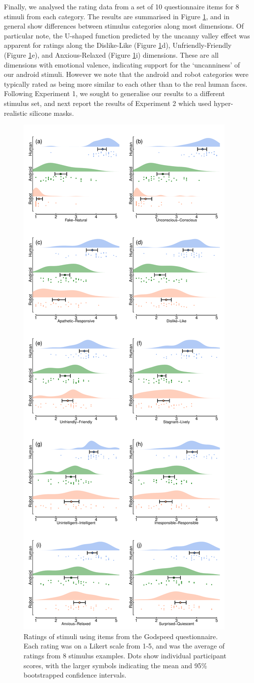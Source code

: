 \documentclass[
]{article}
\begin{document}
Finally, we analysed the rating data from a set of 10 questionnaire items for 8 stimuli from each category. The results are summarised in Figure \ref{fig:robotratings}, and in general show differences between stimulus categories along most dimensions. Of particular note, the U-shaped function predicted by the uncanny valley effect was apparent for ratings along the Dislike-Like (Figure \ref{fig:robotratings}d), Unfriendly-Friendly (Figure \ref{fig:robotratings}e), and Anxious-Relaxed (Figure \ref{fig:robotratings}i) dimensions. These are all dimensions with emotional valence, indicating support for the `uncanniness' of our android stimuli. However we note that the android and robot categories were typically rated as being more similar to each other than to the real human faces. Following Experiment 1, we sought to generalise our results to a different stimulus set, and next report the results of Experiment 2 which used hyper-realistic silicone masks.

\begin{figure}

{\centering \includegraphics[width=0.5\linewidth]{Figures/RobotRatings} 

}

\caption{Ratings of stimuli using items from the Godspeed questionnaire. Each rating was on a Likert scale from 1-5, and was the average of ratings from 8 stimulus examples. Dots show individual participant scores, with the larger symbols indicating the mean and 95\% bootstrapped confidence intervals.}\label{fig:robotratings}
\end{figure}
\end{document}
